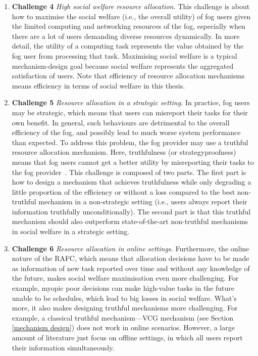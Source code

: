 \documentclass[11pt]{phdthesis}
\begin{document}
\begin{enumerate}
    \item \label{itm: Challenge social welfare} \textbf{Challenge 4} \textit{High social welfare resource allocation.} This challenge is about how to maximise the social welfare (i.e., the overall utility) of fog users given the limited computing and networking resources of the fog, especially when there are a lot of users demanding diverse resources dynamically. In more detail, the utility of a computing task represents the value obtained by the fog user from processing that task. Maximising social welfare is a typical mechanism-design goal because social welfare represents the aggregated satisfaction of users. Note that efficiency of resource allocation mechanisms means efficiency in terms of social welfare in this thesis.
	
	\item \label{itm: Challenge truthful} \textbf{Challenge 5} \textit{Resource allocation in a strategic setting.} In practice, fog users may be strategic, which means that users can misreport their tasks for their own benefit. In general, such behaviours are detrimental to the overall efficiency of the fog, and possibly lead to much worse system performance than expected. To address this problem, the fog provider may use a truthful resource allocation mechanism. Here, truthfulness (or strategyproofness) means that fog users cannot get a better utility by misreporting their tasks to the fog provider~\citep{nisan2007algorithmic}. This challenge is composed of two parts. The first part is how to design a mechanism that achieves truthfulness while only degrading a little proportion of the efficiency or without a loss compared to the best non-truthful mechanism in a non-strategic setting (i.e., users always report their information truthfully unconditionally). The second part is that this truthful mechanism should also outperform state-of-the-art non-truthful mechanisms in social welfare in a strategic setting.
	
	\item \label{itm: Challenge online} \textbf{Challenge 6} \textit{Resource allocation in online settings.}
	Furthermore, the online nature of the RAFC, which means that allocation decisions have to be made as information of new task reported over time and without any knowledge of the future, makes social welfare maximisation even more challenging. For example, myopic poor decisions can make high-value tasks in the future unable to be schedules, which lead to big losses in social welfare. What's more, it also makes designing truthful mechanisms more challenging. For example, a classical truthful mechanism---VCG mechanism (see Section \ref{mechanism design}) does not work in online scenarios. However, a large amount of literature just focus on offline settings, in which all users report their information simultaneously. 
	

\end{enumerate}
\end{document}
